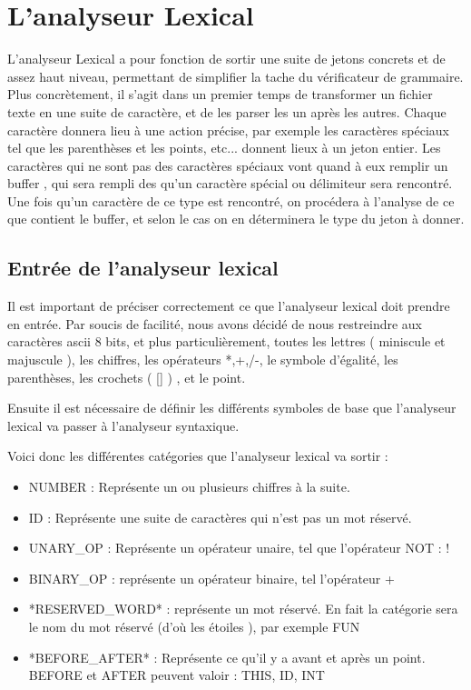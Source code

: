 \section{L'analyseur Lexical}

L'analyseur Lexical a pour fonction de sortir une suite de jetons concrets et de assez haut niveau, permettant de simplifier la tache du vérificateur de grammaire. Plus concrètement, il s'agit dans un premier temps de transformer un fichier texte en une suite de caractère, et de les parser les un après les autres. Chaque caractère donnera lieu à une action précise, par exemple les caractères spéciaux tel que les parenthèses et les points, etc... donnent lieux à un jeton entier.
Les caractères qui ne sont pas des caractères spéciaux vont quand à eux remplir un buffer , qui sera rempli des qu'un caractère spécial ou délimiteur sera rencontré. Une fois qu'un caractère de ce type est rencontré, on procédera à l'analyse de ce que contient le buffer, et selon le cas on en déterminera le type du jeton à donner.

\subsection{Entrée de l'analyseur lexical}

Il est important de préciser correctement ce que l'analyseur lexical doit prendre en entrée. Par soucis de facilité, nous avons décidé de nous restreindre aux caractères ascii 8 bits, et plus particulièrement, toutes les lettres ( miniscule et majuscule ), les chiffres, les opérateurs *,+,/-, le symbole d'égalité, les parenthèses, les crochets ( [] ) ,  et le point.

Ensuite il est nécessaire de définir les différents symboles de base que l'analyseur lexical va passer à l'analyseur syntaxique.

Voici donc les différentes catégories que l'analyseur lexical va sortir :

\begin{itemize}
	\item NUMBER  : Représente un ou plusieurs chiffres à la suite.
	\item ID : Représente une suite de caractères qui n'est pas un mot réservé.
	\item UNARY_OP : Représente un opérateur unaire, tel que l'opérateur NOT : !
	\item BINARY_OP : représente un opérateur binaire, tel l'opérateur +
	\item *RESERVED_WORD* : représente un mot réservé. En fait la catégorie sera le nom du mot réservé (d'où les étoiles ), par exemple FUN
	\item *BEFORE_AFTER* : Représente ce qu'il y a avant et après un point. BEFORE et AFTER peuvent valoir : THIS, ID, INT
\end{itemize}

